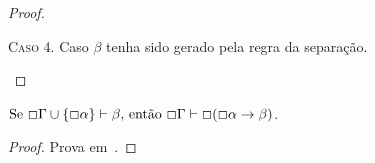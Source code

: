 \begin{theorem}
\begin{proof}
            \begin{case}
                \textsc{Caso 4.} Caso $\beta$ tenha sido gerado pela regra da separação.
            \end{case}
        \end{proof}
    \end{theorem}

    \begin{theorem}
        $\text{Se }\Box\Gamma\cup\left\{\Box\alpha\right\}\vdash\beta\text{, então }\Box\Gamma\vdash\Box(\Box\alpha\to\beta)$.

        \begin{proof}
            Prova em~\cite{Marcus}.
        \end{proof}
    \end{theorem}




                

